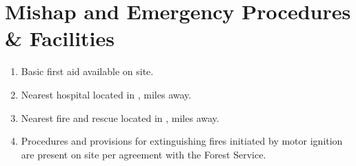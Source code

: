 \documentclass[12pt]{article}
\newcommand{\ph}{\framebox[48pt]{\rule{0pt}{12pt}}}
\begin{document}
\section{Mishap and Emergency Procedures \& Facilities}
\begin{enumerate}[label=(\alph*)]
    \item Basic first aid available on site.
    \item Nearest hospital located in \ph, \ph miles away.
    \item Nearest fire and rescue located in \ph, \ph miles away.
    \item Procedures and provisions for extinguishing fires initiated by motor ignition are present on site per agreement with the Forest Service.

\end{enumerate}
\end{document}

